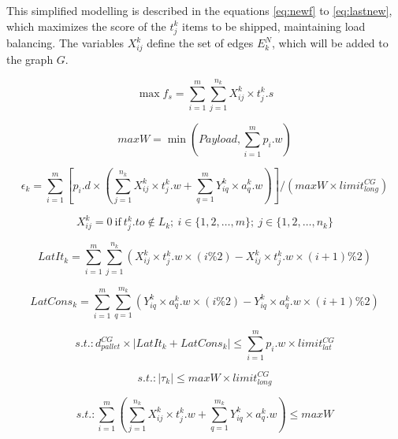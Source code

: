 \documentclass[preprint,authoryear]{elsarticle}
\begin{document}
This simplified modelling is described in the equations \ref{eq:newf} to \ref{eq:lastnew}, which maximizes the score of the $t^k_j$\/ items to be shipped, maintaining load balancing. The variables $X^k_{ij}$\/ define the set of edges $E^N_k$, which will be added to the graph $G$.


\begin{equation} \label{eq:newf}
	\max f_s = \sum_{i=1}^{m} \sum_{j=1}^{n_k} X_{ij}^k \times t_j^k.s
\end{equation}

\begin{equation} 
	maxW = \min(Payload, \sum_{i=1}^{m}p_i.w)
\end{equation}

\begin{equation} 
	\epsilon_k = \sum_{i=1}^{m}[ p_i.d \times (\sum_{j=1}^{n_k} X_{ij}^k \times t_j^k.w +  \sum_{q=1}^{m} Y_{iq}^k \times a_q^k.w)]/(maxW \times limit^{CG}_{long})
\end{equation}

\begin{equation}
	X_{ij}^k = 0 \ \mbox{if} \ t_j^k.to \notin L_k; \ i \in \{1, 2, \ldots, m\}; \ j \in \{1, 2, \ldots, n_k\}
\end{equation}

\begin{equation} 
	LatIt_k = \sum_{i=1}^{m} \sum_{j=1}^{n_k} ( X_{ij}^k \times t_j^k.w \times (i\%2) - X_{ij}^k \times t_j^k.w \times (i+1)\%2 )
\end{equation}

\begin{equation} 
	LatCons_k =  \sum_{i=1}^{m} \sum_{q=1}^{m_k}  ( Y_{iq}^k \times a_q^k.w \times (i\%2) - Y_{iq}^k \times a_q^k.w \times (i+1)\%2)
\end{equation}

\begin{equation} 
	s.t.: d^{CG}_{pallet} \times | LatIt_k + LatCons_k | \leq  \sum_{i=1}^{m}p_i.w \times limit^{CG}_{lat}
\end{equation}

\begin{equation}
	s.t.: |\tau_k| \leq maxW \times limit^{CG}_{long}
\end{equation}

\begin{equation} 
	s.t.: \sum_{i=1}^{m} (\sum_{j=1}^{n_k} X_{ij}^k \times t_j^k.w + \sum_{q=1}^{m_k} Y_{iq}^k \times a_q^k.w ) \leq maxW
\end{equation}
\end{document}
